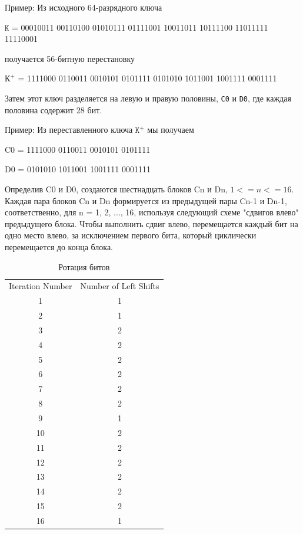 Пример: Из исходного 64-разрядного ключа

$\texttt{K}$ = 00010011 00110100 01010111 01111001 10011011 10111100 11011111 11110001

получается 56-битную перестановку

$\texttt{К}^{+}$ = 1111000 0110011 0010101 0101111 0101010 1011001 1001111 0001111

Затем этот ключ разделяется на левую и правую половины, \texttt{C0} и \texttt{D0}, где каждая половина содержит 28 бит.

Пример: Из переставленного ключа $\texttt{K}^{+}$ мы получаем

C0 = 1111000 0110011 0010101 0101111

D0 = 0101010 1011001 1001111 0001111

Определив C0 и D0, создаются шестнадцать блоков Cn и Dn, $1<=n<=16$. 
Каждая пара блоков Cn и Dn формируется из предыдущей пары Cn-1 и Dn-1, соответственно, для n = 1, 2, ..., 16, используя следующий схеме "сдвигов влево" предыдущего блока. 
Чтобы выполнить сдвиг влево, перемещается каждый бит на одно место влево, за исключением первого бита, который циклически перемещается до конца блока.

\begin{table}[ht!]
    \begin{center}
		\captionsetup{justification=raggedright,singlelinecheck=off}
		\caption{\label{tbl:rot} Ротация битов}
        \begin{tabular}{ |c c| }
Iteration Number  &  Number of Left Shifts \\
                          1    &      1 \\
                          2     &     1 \\
                          3     &     2 \\
                          4     &     2 \\
                          5     &     2 \\
                          6     &     2 \\
                          7    &      2 \\
                          8     &     2 \\
                          9     &     1 \\
                         10     &     2 \\
                         11      &    2 \\
                         12     &     2 \\
                         13     &     2 \\
                         14    &      2 \\
                         15     &     2 \\
                         16      &    1
        \end{tabular}
    \end{center}
\end{table}

